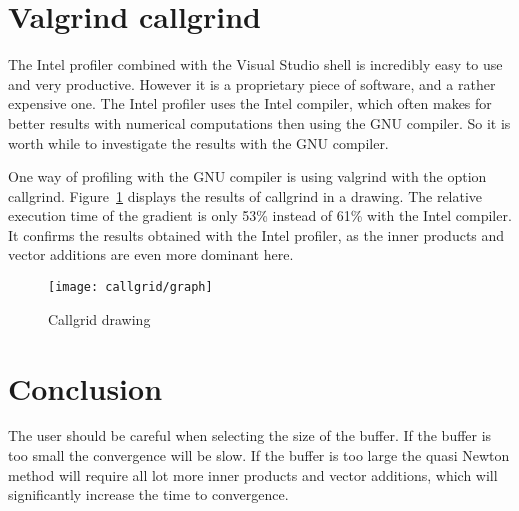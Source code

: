 \section{Valgrind callgrind}
The Intel profiler combined with the Visual Studio shell is incredibly easy to use and very productive. However it is a proprietary piece of software, and a rather expensive one. The Intel profiler uses the Intel compiler, which often makes for better results with numerical computations then using the GNU compiler. So it is worth while to investigate the results with the GNU compiler.

One way of profiling with the GNU compiler is using valgrind with the option callgrind. Figure~\ref{fig:callgrid} displays the results of callgrind in a drawing. The relative execution time of the gradient is only 53\% instead of 61\% with the Intel compiler. It confirms the results obtained with the Intel profiler, as the inner products and vector additions are even more dominant here.

\begin{figure}[H]
	\centering
	\texttt{[image: callgrid/graph]}
	\caption{Callgrid drawing}
	\label{fig:callgrid}
\end{figure}

\section{Conclusion}
The user should be careful when selecting the size of the buffer. If the buffer is too small the convergence will be slow. If the buffer is too large the quasi Newton method will require all lot more inner products and vector additions, which will significantly increase the time to convergence.
